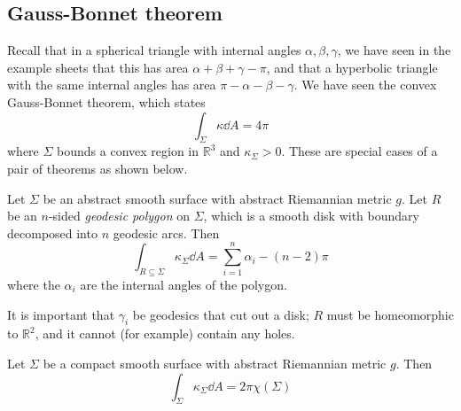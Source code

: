 \subsection{Gauss-Bonnet theorem}
Recall that in a spherical triangle with internal angles \( \alpha, \beta, \gamma \), we have seen in the example sheets that this has area \( \alpha + \beta + \gamma - \pi \), and that a hyperbolic triangle with the same internal angles has area \( \pi - \alpha - \beta - \gamma \).
We have seen the convex Gauss-Bonnet theorem, which states
\[ \int_\Sigma \kappa \dd{A} = 4\pi \]
where \( \Sigma \) bounds a convex region in \( \mathbb R^3 \) and \( \kappa_\Sigma > 0 \).
These are special cases of a pair of theorems as shown below.
\begin{theorem}
	Let \( \Sigma \) be an abstract smooth surface with abstract Riemannian metric \( g \).
	Let \( R \) be an \( n \)-sided \textit{geodesic polygon} on \( \Sigma \), which is a smooth disk with boundary decomposed into \( n \) geodesic arcs.
	Then
	\[ \int_{R \subseteq \Sigma} \kappa_\Sigma \dd{A} = \sum_{i=1}^n \alpha_i - (n-2)\pi \]
	where the \( \alpha_i \) are the internal angles of the polygon.
\end{theorem}
It is important that \( \gamma_i \) be geodesics that cut out a disk; \( R \) must be homeomorphic to \( \mathbb R^2 \), and it cannot (for example) contain any holes.
\begin{theorem}
	Let \( \Sigma \) be a compact smooth surface with abstract Riemannian metric \( g \).
	Then
	\[ \int_\Sigma \kappa_\Sigma \dd{A} = 2\pi \chi(\Sigma) \]
\end{theorem}
